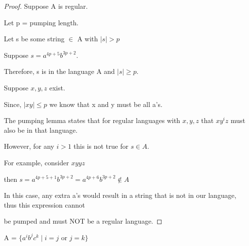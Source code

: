\documentclass[10pt]{article}
\newenvironment{problem}[2][Problem]{\begin{trivlist}
\item[\hskip \labelsep {\bfseries #1}\hskip \labelsep {\bfseries #2.}]}{\end{trivlist}}
\begin{document}
\begin{proof}[Proof] 

Suppose A is regular. \newline

Let p = pumping length.

Let s be some string $\in$ A with $|s| > p$ \newline

Suppose $ s = a^{4p+5}b^{3p+2}$.

Therefore, s is in the language A and $|s| \geq p$. \newline

Suppose $x,y,z$ exist.

Since, $|xy| \leq p$ we know that x and y must be all a's. \newline

The pumping lemma states that for regular languages with $x,y,z$ that $xy^iz$ must also be in that language. 

However, for any $i > 1$ this is not true for $ s \in A $. \newline

For example, consider $xyyz$

\begin{center}
then $s = a^{4p+5+1}b^{3p+2} = a^{4p+6}b^{3p+2} \notin A$
\end{center}

In this case, any extra a's would result in a string that is not in our language, thus this expression cannot 

be pumped and must NOT be a regular language.





\end{proof}

\begin{problem}{3}
A = $\{a^ib^jc^k \mid i = j \mbox{ or } j = k\}$
\end{problem}
\end{document}
